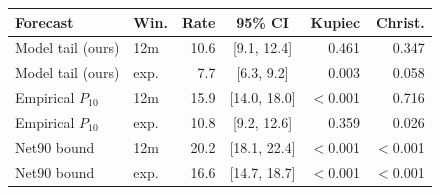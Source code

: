 \begin{tabular}{@{}llrcrr@{}}
\toprule
Forecast & Win. & Rate & 95\% CI & Kupiec & Christ. \\
\midrule
Model tail (ours) & 12m & 10.6 & [9.1, 12.4] & 0.461 & 0.347 \\
Model tail (ours) & exp. & 7.7 & [6.3, 9.2] & 0.003 & 0.058 \\
Empirical $P_{10}$ & 12m & 15.9 & [14.0, 18.0] & $<$0.001 & 0.716 \\
Empirical $P_{10}$ & exp. & 10.8 & [9.2, 12.6] & 0.359 & 0.026 \\
Net90 bound & 12m & 20.2 & [18.1, 22.4] & $<$0.001 & $<$0.001 \\
Net90 bound & exp. & 16.6 & [14.7, 18.7] & $<$0.001 & $<$0.001 \\
\bottomrule
\end{tabular}
